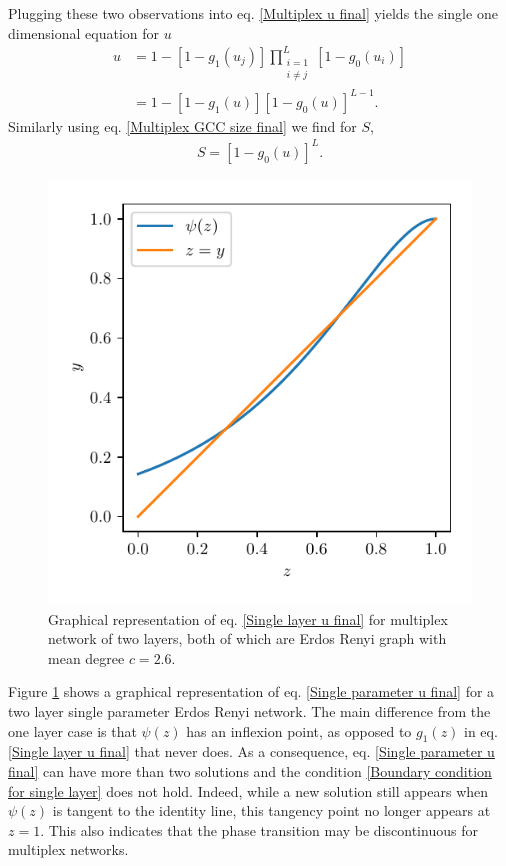 \documentclass[
11pt, %
english, %
singlespacing, %
nolistspacing, %
liststotoc, %
headsepline, %
]{MastersDoctoralThesis} %
\begin{document}
Plugging these two observations into eq. \eqref{Multiplex u final} yields the single one dimensional equation for $u$
\begin{align}
	u &= 1 - \left[1 - g_1(u_j) \right] \prod_{\substack{i = 1 \\ i \neq j}}^{L}  \left[1 - g_0(u_i) \right] \\
		&= 1 - \left[1 - g_1(u) \right] \left[1 - g_0(u) \right]^{L - 1}. \label{Single parameter u final}
\end{align}
Similarly using eq. \eqref{Multiplex GCC size final} we find for $S$,
\begin{align}
	S = \left[1 - g_0(u) \right]^L. \label{Single parameter u final}
\end{align}

\begin{figure}
	\includegraphics[scale=1]{single_param_u_solution_graphically.pdf}
	\caption{Graphical representation of eq. \eqref{Single layer u final} for multiplex network of two layers, both of which are Erdos Renyi graph with mean degree $c = 2.6$.}
	\label{Figure: Solution of u = psi(u) graphically for single param}
\end{figure}

Figure \ref{Figure: Solution of u = psi(u) graphically for single param} shows a graphical representation of eq. \eqref{Single parameter u final} for a two layer single parameter Erdos Renyi network. The main difference from the one layer case is that $\psi(z)$ has an inflexion point, as opposed to $g_1(z)$ in eq. \eqref{Single layer u final} that never does. As a consequence, eq. \eqref{Single parameter u final} can have more than two solutions and the condition \eqref{Boundary condition for single layer} does not hold. Indeed, while a new solution still appears when $\psi(z)$ is tangent to the identity line, this tangency point no longer appears at $z = 1$. This also indicates that the phase transition may be discontinuous for multiplex networks. 
\end{document}

